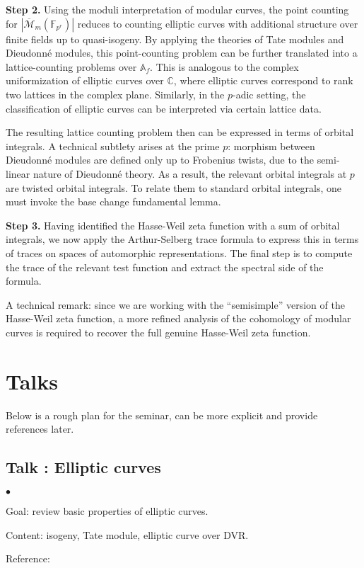 \documentclass[a4paper, reqno]{amsart} %
\theoremstyle{definition}
\numberwithin{equation}{section}
\newcommand{\mbA}{\mathbb{A}}
\newcommand{\mbC}{\mathbb{C}}
\newcommand{\mbF}{\mathbb{F}}
\newcommand{\mcM}{\mathcal{M}}
\newcommand{\ov}{\overline}
\newenvironment{altitemize}
	{\begin{list}
			{$\bullet$}
			{\setlength{\labelwidth}{0pt}
				\setlength{\itemindent}{5pt}
				\setlength{\labelsep}{5pt}
				\setlength{\leftmargin}{0pt}
				\setlength{\itemsep}{\the\smallskipamount}
		}}
		{\end{list}}
\begin{document}
\noindent\textbf{Step 2.} Using the moduli interpretation of modular curves, the point counting for $|\ov{\mcM}_{m}(\mbF_{p^r})|$ reduces to counting elliptic curves with additional structure over finite fields up to quasi-isogeny. 
By applying the theories of Tate modules and Dieudonn\'e modules, this point-counting problem can be further translated into a lattice-counting problems over $\mbA_{f}$. 
This is analogous to the complex uniformization of elliptic curves over $\mbC$, where elliptic curves correspond to rank two lattices in the complex plane. 
Similarly, in the $p$-adic setting, the classification of elliptic curves can be interpreted via certain lattice data.

The resulting lattice counting problem then can be expressed in terms of orbital integrals. 
A technical subtlety arises at the prime $p$: morphism between Dieudonn\'e modules are defined only up to Frobenius twists, due to the semi-linear nature of Dieudonn\'e theory. As a result, the relevant orbital integrals at $p$ are twisted orbital integrals. To relate them to standard orbital integrals, one must invoke the base change fundamental lemma.


\noindent\textbf{Step 3.} 
Having identified the Hasse-Weil zeta function with a sum of orbital integrals, we now apply the Arthur-Selberg trace formula to express this in terms of traces on spaces of automorphic representations. The final step is to compute the trace of the relevant test function and extract the spectral side of the formula.

A technical remark: since we are working with the ``semisimple'' version of the Hasse-Weil zeta function, a more refined analysis of the cohomology of modular curves is required to recover the full genuine Hasse-Weil zeta function.

\section{Talks}
Below is a rough plan for the seminar, can be more explicit and provide references later.
\subsection{Talk : Elliptic curves}
\begin{altitemize}
\item[Goal:] review basic properties of elliptic curves.
\item[Content:] isogeny, Tate module, elliptic curve over DVR.
\item[Reference:]
\end{altitemize}
\end{document}

